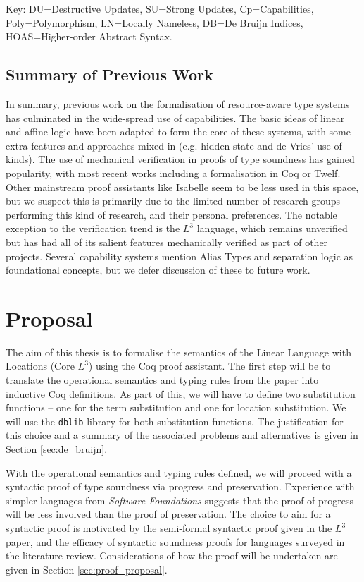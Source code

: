 \documentclass[]{unswthesis}
\let\c\texttt
\begin{document}
Key: DU=Destructive Updates, SU=Strong Updates, Cp=Capabilities, Poly=Polymorphism, LN=Locally Nameless, DB=De Bruijn Indices, HOAS=Higher-order Abstract Syntax.

\section{Summary of Previous Work}

In summary, previous work on the formalisation of resource-aware type systems has culminated in the wide-spread use of capabilities. The basic ideas of linear and affine logic have been adapted to form the core of these systems, with some extra features and approaches mixed in (e.g. hidden state and de Vries' use of kinds). The use of mechanical verification in proofs of type soundness has gained popularity, with most recent works including a formalisation in Coq or Twelf. Other mainstream proof assistants like Isabelle seem to be less used in this space, but we suspect this is primarily due to the limited number of research groups performing this kind of research, and their personal preferences. The notable exception to the verification trend is the $L^3$ language, which remains unverified but has had all of its salient features mechanically verified as part of other projects. Several capability systems mention Alias Types \cite{smith00} and separation logic \cite{reynolds02} as foundational concepts, but we defer discussion of these to future work.

\chapter{Proposal}
\label{ch:proposal}

The aim of this thesis is to formalise the semantics of the Linear Language with Locations (Core $L^3$) using the Coq proof assistant. The first step will be to translate the operational semantics and typing rules from the paper \cite{ahmed05} into inductive Coq definitions. As part of this, we will have to define two substitution functions -- one for the term substitution and one for location substitution. We will use the \c{dblib} library \cite{dblib13} for both substitution functions. The justification for this choice and a summary of the associated problems and alternatives is given in Section \ref{sec:de_bruijn}.

With the operational semantics and typing rules defined, we will proceed with a syntactic proof of type soundness via progress and preservation. Experience with simpler languages from \textit{Software Foundations} \cite{pierce15} suggests that the proof of progress will be less involved than the proof of preservation. The choice to aim for a syntactic proof is motivated by the semi-formal syntactic proof given in the $L^3$ paper, and the efficacy of syntactic soundness proofs for languages surveyed in the literature review. Considerations of how the proof will be undertaken are given in Section \ref{sec:proof_proposal}.
\end{document}
